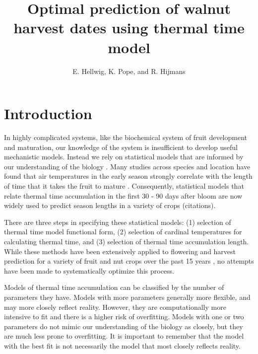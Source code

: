 \documentclass{amsart}
\title{Optimal prediction of walnut harvest dates using thermal time model}
\author{E. Hellwig, K. Pope, and R. Hijmans}
\begin{document}
\linenumbers
\maketitle



\section*{Introduction}


In highly complicated systems, like the biochemical system of fruit development and maturation, our knowledge of the system is insufficient to develop useful mechanistic models. Instead we rely on statistical models that are informed by our understanding of the biology \citep{crepinsek2006}. Many studies across species and location have found that air temperatures in the early season strongly correlate with the length of time that it takes the fruit to mature \citep{debuse2008, marra2001, mimoun1998, ruml2011, schaber2003, tombesi2010}. Consequently, statistical models that relate thermal time accumulation in the first 30 - 90 days after bloom are now widely used to predict season lengths in a variety of crops (citations).

There are three steps in specifying these statistical models: (1) selection of thermal time model functional form, (2) selection of cardinal temperatures for calculating thermal time, and (3) selection of thermal time accumulation length. While these methods have been extensively applied to flowering and harvest prediction for a variety of fruit and nut crops over the past 15 years \citep{mimoun1998,marra2001,debuse2008,ruml2011}, no attempts have been made to systematically optimize this process.




Models of thermal time accumulation can be classified by the number of parameters they have.  Models with more parameters generally more flexible, and may more closely reflect reality. However, they are computationally more intensive to fit and there is a higher risk of overfitting. Models with one or two parameters do not mimic our understanding of the biology as closely, but they are much less prone to overfitting. It is important to remember that the model with the best fit is not necessarily the model that most closely reflects reality.
\end{document}
